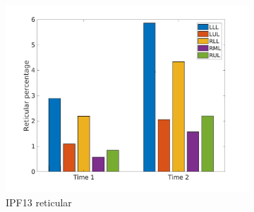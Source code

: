 \begin{figure}[H]
\begin{subfigure}{.46\linewidth}%
  \includegraphics[width=\linewidth,trim={{.0\wd0} {.0\wd0} {.0\wd0} {.0\wd0}},clip]{Appendix/Image_AppexA/LobarDistribution/IPF13ReticularLobarRegionDiseaseDistributionOverTime.jpg}
  \caption{IPF13 reticular}
  \label{fig:IPF13LobarRegionDiseaseDistributionOverTime-b}
\end{subfigure}
\begin{subfigure}{.46\linewidth}%

\end{subfigure}
\end{figure}
